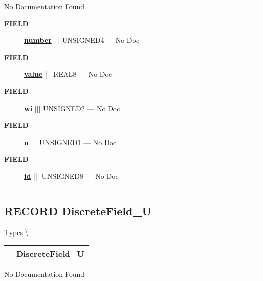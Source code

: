\par





No Documentation Found







\par
\begin{description}
\item [\colorbox{tagtype}{\color{white} \textbf{\textsf{FIELD}}}] \textbf{\underline{number}} ||| UNSIGNED4 --- No Doc
\item [\colorbox{tagtype}{\color{white} \textbf{\textsf{FIELD}}}] \textbf{\underline{value}} ||| REAL8 --- No Doc
\item [\colorbox{tagtype}{\color{white} \textbf{\textsf{FIELD}}}] \textbf{\underline{wi}} ||| UNSIGNED2 --- No Doc
\item [\colorbox{tagtype}{\color{white} \textbf{\textsf{FIELD}}}] \textbf{\underline{u}} ||| UNSIGNED1 --- No Doc
\item [\colorbox{tagtype}{\color{white} \textbf{\textsf{FIELD}}}] \textbf{\underline{id}} ||| UNSIGNED8 --- No Doc
\end{description}





\rule{\linewidth}{0.5pt}
\subsection*{\textsf{\colorbox{headtoc}{\color{white} RECORD}
DiscreteField\_U}}

\hypertarget{ecldoc:logisticregression.types.discretefield_u}{}
\hspace{0pt} \hyperlink{ecldoc:LogisticRegression.Types}{Types} \textbackslash 

{\renewcommand{\arraystretch}{1.5}
\begin{tabularx}{\textwidth}{|>{\raggedright\arraybackslash}l|X|}
\hline
\hspace{0pt}\mytexttt{\color{red} } & \textbf{DiscreteField\_U} \\
\hline
\end{tabularx}
}

\par





No Documentation Found







